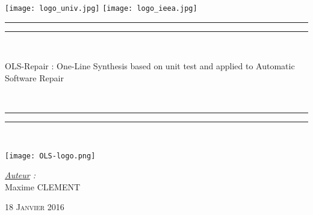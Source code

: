 \thispagestyle{cover}

\texttt{[image: logo\_univ.jpg]}
 \hfill \texttt{[image: logo\_ieea.jpg]} \\

\vspace*{10mm}

\begin{center}

	\vspace*{10mm}


	\rule[0.5ex]{\linewidth}{2pt}\vspace*{-\baselineskip}\vspace*{3.2pt}


	\rule[0.5ex]{\linewidth}{1pt}\\[\baselineskip]

		\begin{Huge}OLS-Repair : One-Line Synthesis based on unit test and applied to Automatic Software Repair \end{Huge}\\[4mm]

	\rule[0.5ex]{\linewidth}{1pt}\vspace*{-\baselineskip}\vspace{3.2pt}
	\rule[0.5ex]{\linewidth}{2pt}\\

	\vspace*{20mm}

	\texttt{[image: OLS-logo.png]}

	{\LARGE \textit{\underline{Auteur} :}}\\
	\vspace*{3mm}
	{\LARGE Maxime CLEMENT}\\
	
	\vspace*{20mm}
	
	{\LARGE\textsc{18 Janvier 2016}}
	
\end{center}